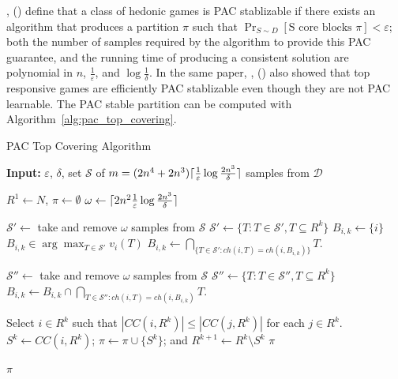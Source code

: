 \documentclass[letterpaper]{article} %
\newcommand{\citename}[1]{\citeauthor{#1}, (\citeyear{#1})}
\DeclarePairedDelimiter\ceil{\lceil}{\rceil}
\renewcommand{\cal}[1]{\mathcal{#1}}
\newcommand{\eps}{\varepsilon}
\newcommand{\ch}{\mathit{ch}}
\newcommand{\CC}{\mathit{CC}}
\newcommand{\samples}{\omega}
\theoremstyle{definition}
\begin{document}
\citename{ijcai2017-380} define that a class of hedonic games is PAC stablizable if there exists an algorithm that produces a partition $\pi$ such that $\Pr_{S\sim D}[\text{S core blocks } \pi] < \varepsilon$; both the number of samples required by the algorithm to provide this PAC guarantee, and the running time of producing a consistent solution are polynomial in $n$, $\frac{1}{\varepsilon}$, and $\log{\frac{1}{\delta}}$. In the same paper, \citename{ijcai2017-380} also showed that top responsive games are efficiently PAC stablizable even though they are not PAC learnable. The PAC stable partition can be computed with Algorithm~\ref{alg:pac_top_covering}.

\begin{algorithm}[htb]
  \caption{PAC Top Covering Algorithm}
  \label{alg:pac_top_covering}
  \textbf{Input:} $\eps$, $\delta$, set $\cal S$ of $m = (2n^4 + 2n^3)\ceil{\frac{1}{\eps}\log\frac{2n^3}{\delta}}$ samples from $\cal D$
  \begin{algorithmic}[1]

  \State $R^1 \gets N$, $\pi \gets \emptyset$
  \State $\samples \gets \ceil{2n^2 \frac{1}{\eps}\log\frac{2n^3}{\delta}}$

    \State \label{pac_top_cover:sample_begin} $\cal S' \gets$ take and remove $\samples$ samples from $\cal S$
    \State $\cal S' \gets \{T: T \in \cal S', T \subseteq R^k\}$
      \If{$i \notin \bigcup_{X \in \cal S'} X$}
        \State$B_{i,k} \gets \{i\}$
      \Else
        \State $B_{i,k} \in \arg\max_{T \in \cal S'}{v_i(T)}$
        \State $B_{i,k} \gets \underset{\{T \in \cal S' : \ch(i,T) = \ch(i,B_{i,k})\}}{\bigcap} T$.
      \EndIf
    \EndFor

      \State $\cal S'' \gets$ take and remove $\samples$ samples from $\cal S$
      \State $\cal S'' \gets \{T: T \in \cal S'', T \subseteq R^k\}$
        \State $B_{i,k} \gets B_{i,k} \cap \underset{T \in \cal S'' : \ch(i,T) = \ch(i,B_{i,k})}{\bigcap} T$.
      \EndFor
    \EndFor \label{pac_top_cover:sample_end}

    \State Select $i\in R^k$ such that $|\CC(i,R^k)| \leq |\CC(j,R^k)|$ for each $j\in R^k$.
    \State $S^k\leftarrow  \CC(i,R^k)$; $\pi \leftarrow  \pi \cup \lbrace S^k \rbrace$;  and $R^{k+1} \leftarrow  R^k \setminus S^k$
      \State \Return $\pi$
    \EndIf
  \EndFor

  \State \Return $\pi$
 \end{algorithmic}
\end{algorithm}
\end{document}
